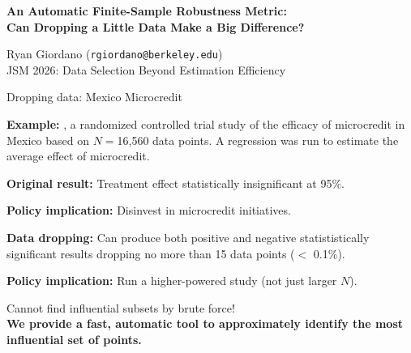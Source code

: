 
\begin{frame}

\begin{center}
\large
\textbf{
An Automatic Finite-Sample Robustness Metric:
\\Can Dropping a Little Data Make a Big Difference?}
\end{center}

\hrulefill
\vspace{1em}

Ryan Giordano (\texttt{rgiordano@berkeley.edu})\footnotemark[1]\\[1em]

JSM 2026:
Data Selection Beyond Estimation Efficiency



\end{frame}


\begin{frame}[t]{Dropping data: Mexico Microcredit}


\vspace{1em} \textbf{Example:} \textcite{angelucci2015microcredit}, a randomized
controlled trial study of the efficacy of microcredit in Mexico based on $N =
$16,560 data points. A regression was run to estimate the average effect of
microcredit.

\hrulefill

\vspace{1em}
\textbf{Original result: }
Treatment effect statistically insignificant at 95\%.

\vspace{1em}
\textbf{Policy implication: } Disinvest in microcredit initiatives.

\hrulefill

\pause

\vspace{0.5em} \textbf{Data dropping: } Can produce both positive and negative
statististically significant results dropping no more than 15 data points
($<$ 0.1\%).

\vspace{0.5em}
\textbf{Policy implication: } Run a higher-powered study (not just
larger $N$).


\hrulefill

\pause

Cannot find influential subsets by brute force!\\[0.5em]

\textbf{We provide a fast, automatic tool to  approximately identify the
most influential set of points.}


\end{frame}


